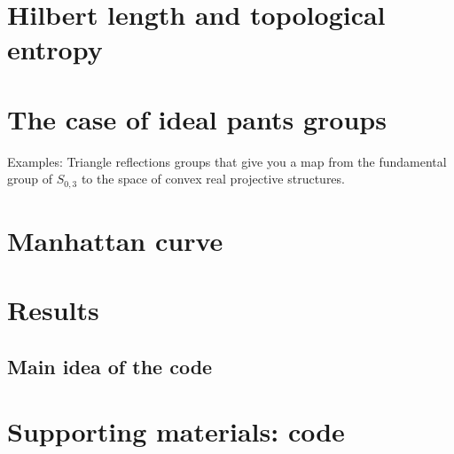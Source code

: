 \documentclass{amsart}
\begin{document}
\section{Hilbert length and topological entropy}
\section{The case of ideal pants groups}
Examples: Triangle reflections groups that give you a map from the fundamental group of $S_{0,3}$ to the space of convex real projective structures.
\section{Manhattan curve}
\section{Results}
\subsection{Main idea of the code}
\section{Supporting materials: code}

\newpage
\end{document}
